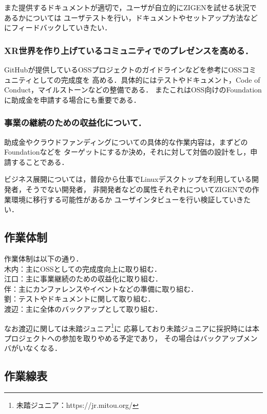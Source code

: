 また提供するドキュメントが適切で，ユーザが自立的にZIGENを試せる状況であるかについては
ユーザテストを行い，ドキュメントやセットアップ方法などにフィードバックしていきたい．

\subsubsection*{XR世界を作り上げているコミュニティでのプレゼンスを高める．}

GitHubが提供しているOSSプロジェクトのガイドラインなどを参考にOSSコミュニティとしての完成度を
高める．具体的にはテストやドキュメント，Code of Conduct，マイルストーンなどの整備である．
またこれはOSS向けのFoundationに助成金を申請する場合にも重要である．

\subsubsection*{事業の継続のための収益化について．}

助成金やクラウドファンディングについての具体的な作業内容は，まずどのFoundationなどを
ターゲットにするか決め，それに対して対価の設計をし，申請することである．

ビジネス展開については，普段から仕事でLinuxデスクトップを利用している開発者，そうでない開発者，
非開発者などの属性それぞれについてZIGENでの作業環境に移行する可能性があるか
ユーザインタビューを行い検証していきたい．

\subsection{作業体制}

作業体制は以下の通り．\\
木内：主にOSSとしての完成度向上に取り組む．\\
江口：主に事業継続のための収益化に取り組む．\\
伴：主にカンファレンスやイベントなどの準備に取り組む．\\
劉：テストやドキュメントに関して取り組む．\\
渡辺：主に全体のバックアップとして取り組む．

なお渡辺に関しては未踏ジュニア\footnote{未踏ジュニア：https://jr.mitou.org/}に
応募しており未踏ジュニアに採択時には本プロジェクトへの参加を取りやめる予定であり，
その場合はバックアップメンバがいなくなる．

\subsection{作業線表}

